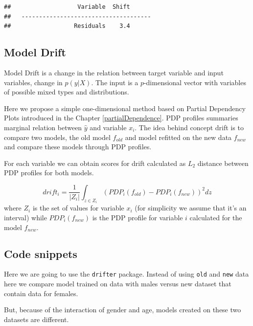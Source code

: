 \documentclass[]{krantz}
\theoremstyle{definition}
\theoremstyle{definition}
\theoremstyle{definition}
\theoremstyle{remark}
\begin{document}
\begin{verbatim}
##                   Variable  Shift
##   -------------------------------------
##                  Residuals    3.4
\end{verbatim}

\hypertarget{model-drift}{%
\subsection{Model Drift}\label{model-drift}}

Model Drift is a change in the relation between target variable and
input variables, change in \(p(y|X)\). The input is a \(p\)-dimensional
vector with variables of possible mixed types and distributions.

Here we propose a simple one-dimensional method based on Partial
Dependency Plots introduced in the Chapter \ref{partialDependence}. PDP
profiles summaries marginal relation between \(\hat y\) and variable
\(x_i\). The idea behind concept drift is to compare two models, the old
model \(f_{old}\) and model refitted on the new data \(f_{new}\) and
compare these models through PDP profiles.

For each variable we can obtain scores for drift calculated as \(L_2\)
distance between PDP profiles for both models.

\[
drift_{i} = \frac 1 {|Z_i|}\int_{z\in Z_i} (PDP_i(f_{old}) - PDP_i(f_{new}))^2 dz
\] where \(Z_i\) is the set of values for variable \(x_i\) (for
simplicity we assume that it's an interval) while \(PDP_i(f_{new})\) is
the PDP profile for variable \(i\) calculated for the model \(f_{new}\).

\hypertarget{code-snippets-4}{%
\subsection{Code snippets}\label{code-snippets-4}}

Here we are going to use the \texttt{drifter} package. Instead of using
\texttt{old} and \texttt{new} data here we compare model trained on data
with males versus new dataset that contain data for females.

But, because of the interaction of gender and age, models created on
these two datasets are different.
\end{document}

